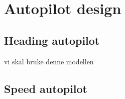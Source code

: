 \section{Autopilot design}\label{sec:prob1}

\subsection{Heading autopilot}
vi skal bruke denne modellen

\subsection{Speed autopilot}